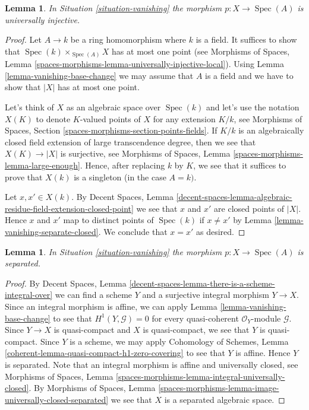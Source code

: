 \documentclass{stacks-project}
\theoremstyle{plain}
\newtheorem{lemma}[subsection]{Lemma}
\theoremstyle{definition}
\theoremstyle{remark}
\numberwithin{equation}{subsection}
\def\Spec{\mathop{\mathrm{Spec}}}
\begin{document}
\begin{lemma}
\label{lemma-vanishing-injective}
In Situation \ref{situation-vanishing} the morphism $p : X \to \Spec(A)$ is
universally injective.
\end{lemma}

\begin{proof}
Let $A \to k$ be a ring homomorphism where $k$ is a field. It suffices to
show that $\Spec(k) \times_{\Spec(A)} X$ has at most one point (see
Morphisms of Spaces, Lemma
\ref{spaces-morphisms-lemma-universally-injective-local}).
Using Lemma \ref{lemma-vanishing-base-change} we may assume that $A$
is a field and we have to show that $|X|$ has at most one point.

\medskip\noindent
Let's think of $X$ as an algebraic space over $\Spec(k)$ and let's
use the notation $X(K)$ to denote $K$-valued points of $X$
for any extension $K/k$, see
Morphisms of Spaces, Section \ref{spaces-morphisms-section-points-fields}.
If $K/k$ is an algebraically closed field extension
of large transcendence degree, then we see that $X(K) \to |X|$
is surjective, see Morphisms of Spaces, Lemma
\ref{spaces-morphisms-lemma-large-enough}. Hence, after replacing $k$
by $K$, we see that it suffices to prove that $X(k)$ is a singleton
(in the case $A = k)$.

\medskip\noindent
Let $x, x' \in X(k)$. By Decent Spaces, Lemma
\ref{decent-spaces-lemma-algebraic-residue-field-extension-closed-point}
we see that $x$ and $x'$ are closed points of $|X|$. Hence $x$ and $x'$
map to distinct points of $\Spec(k)$ if $x \not = x'$ by
Lemma \ref{lemma-vanishing-separate-closed}. We conclude that
$x = x'$ as desired.
\end{proof}

\begin{lemma}
\label{lemma-vanishing-separated}
In Situation \ref{situation-vanishing} the morphism $p : X \to \Spec(A)$ is
separated.
\end{lemma}

\begin{proof}
By Decent Spaces, Lemma
\ref{decent-spaces-lemma-there-is-a-scheme-integral-over}
we can find a scheme $Y$ and a surjective integral morphism
$Y \to X$. Since an integral morphism is affine, we can apply
Lemma \ref{lemma-vanishing-base-change}
to see that $H^1(Y, \mathcal{G}) = 0$ for every
quasi-coherent $\mathcal{O}_Y$-module $\mathcal{G}$.
Since $Y \to X$ is quasi-compact and $X$ is quasi-compact,
we see that $Y$ is quasi-compact.
Since $Y$ is a scheme, we may apply
Cohomology of Schemes, Lemma
\ref{coherent-lemma-quasi-compact-h1-zero-covering}
to see that $Y$ is affine. Hence $Y$ is separated.
Note that an integral morphism is affine and universally closed, see
Morphisms of Spaces, Lemma
\ref{spaces-morphisms-lemma-integral-universally-closed}.
By Morphisms of Spaces, Lemma
\ref{spaces-morphisms-lemma-image-universally-closed-separated}
we see that $X$ is a separated algebraic space.
\end{proof}
\end{document}
